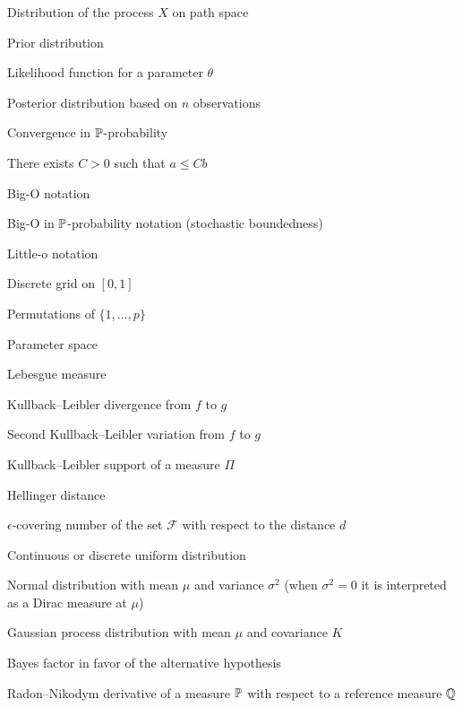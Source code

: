 \begin{symbolsdesc}[labelwidth=6em, leftmargin=6em, style=nextline, itemsep=1pt]
        \item [\(\qq_X\)] Distribution of the process \(X\) on path space
        \item [\(\Pi\)] Prior distribution
        \item [\(L(\cdot \mid \theta)\)] Likelihood function for a parameter \(\theta\)
        \item [\(\Pi_n\)] Posterior distribution based on \(n\) observations
        \item [\(\stackrel{\pp}{\longrightarrow}\)] Convergence in \(\mathbb{P}\)-probability
        \item [\(a\lesssim b\)] There exists \(C>0\) such that \(a\leq Cb\)
        \item [\(O(\cdot)\)] Big-O notation
        \item [\(O_{\pp}(\cdot)\)] Big-O in \(\mathbb{P}\)-probability notation (stochastic boundedness)
        \item [\(o(\cdot)\)] Little-o notation
        \item [\(\mathcal S\)] Discrete grid on \([0,1]\)
        \item [\(\mathfrak S_p\)] Permutations of \(\{1,\dots,p\}\)
        \item [\(\Theta\)] Parameter space
        \item [\(\mathfrak m\)] Lebesgue measure
        \item [\(\dkl(f \,\|\, g)\)] Kullback--Leibler divergence from \(f\) to \(g\)
        \item [\(V_2(f, g)\)] Second Kullback--Leibler variation from \(f\) to \(g\)
        \item [\(\kl(\Pi)\)] Kullback--Leibler support of a measure \(\Pi\)
        \item [\(d_H\)] Hellinger distance
        \item [\(N(\epsilon, \mathcal F, d)\)] \(\epsilon\)-covering number of the set \(\mathcal F\) with respect to the distance \(d\)
        \item [\(\mathcal U\)] Continuous or discrete uniform distribution
        \item [\(\mathcal N(\mu, \sigma^2)\)] Normal distribution with mean \(\mu\) and variance \(\sigma^2\) (when \(\sigma^2=0\) it is interpreted as a Dirac measure at \(\mu\))
        \item [\(\gp(\mu, K)\)] Gaussian process distribution with mean \(\mu\) and covariance \(K\)
        \item [\(\bff_{10}\)] Bayes factor in favor of the alternative hypothesis
        \item [\(\frac{d\pp}{d\qq}\)] Radon--Nikodym derivative of a measure \(\mathbb{P}\) with respect to a reference measure \(\mathbb{Q}\)
    \end{symbolsdesc}
    \endgroup
\endgroup

